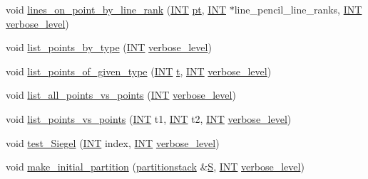 \begin{DoxyCompactItemize}
\item 
void \mbox{\hyperlink{classorthogonal_adc21874b6da3cd3585c704994fb538aa}{lines\+\_\+on\+\_\+point\+\_\+by\+\_\+line\+\_\+rank}} (\mbox{\hyperlink{galois_8h_a09fddde158a3a20bd2dcadb609de11dc}{I\+NT}} \mbox{\hyperlink{clique__finder_8_c_aec1f1a2b30fdca8844c2932384483145}{pt}}, \mbox{\hyperlink{galois_8h_a09fddde158a3a20bd2dcadb609de11dc}{I\+NT}} $\ast$line\+\_\+pencil\+\_\+line\+\_\+ranks, \mbox{\hyperlink{galois_8h_a09fddde158a3a20bd2dcadb609de11dc}{I\+NT}} \mbox{\hyperlink{simeon_8_c_a818073fbcc2f439e7c56952f67386122}{verbose\+\_\+level}})
\item 
void \mbox{\hyperlink{classorthogonal_a078981d509c626c1cdad322ab94c697c}{list\+\_\+points\+\_\+by\+\_\+type}} (\mbox{\hyperlink{galois_8h_a09fddde158a3a20bd2dcadb609de11dc}{I\+NT}} \mbox{\hyperlink{simeon_8_c_a818073fbcc2f439e7c56952f67386122}{verbose\+\_\+level}})
\item 
void \mbox{\hyperlink{classorthogonal_a80ded28f55a2191d5a5ec5fe9ee1a4c7}{list\+\_\+points\+\_\+of\+\_\+given\+\_\+type}} (\mbox{\hyperlink{galois_8h_a09fddde158a3a20bd2dcadb609de11dc}{I\+NT}} \mbox{\hyperlink{alphabet2_8_c_ac310d9181e916ba43604099aee272c71}{t}}, \mbox{\hyperlink{galois_8h_a09fddde158a3a20bd2dcadb609de11dc}{I\+NT}} \mbox{\hyperlink{simeon_8_c_a818073fbcc2f439e7c56952f67386122}{verbose\+\_\+level}})
\item 
void \mbox{\hyperlink{classorthogonal_aa896de1a55608e15b02df00777ac7ccb}{list\+\_\+all\+\_\+points\+\_\+vs\+\_\+points}} (\mbox{\hyperlink{galois_8h_a09fddde158a3a20bd2dcadb609de11dc}{I\+NT}} \mbox{\hyperlink{simeon_8_c_a818073fbcc2f439e7c56952f67386122}{verbose\+\_\+level}})
\item 
void \mbox{\hyperlink{classorthogonal_a80258158dfa1470b42e9036b07c7dfbb}{list\+\_\+points\+\_\+vs\+\_\+points}} (\mbox{\hyperlink{galois_8h_a09fddde158a3a20bd2dcadb609de11dc}{I\+NT}} t1, \mbox{\hyperlink{galois_8h_a09fddde158a3a20bd2dcadb609de11dc}{I\+NT}} t2, \mbox{\hyperlink{galois_8h_a09fddde158a3a20bd2dcadb609de11dc}{I\+NT}} \mbox{\hyperlink{simeon_8_c_a818073fbcc2f439e7c56952f67386122}{verbose\+\_\+level}})
\item 
void \mbox{\hyperlink{classorthogonal_ad6d248c572d92abe41416065addd4a69}{test\+\_\+\+Siegel}} (\mbox{\hyperlink{galois_8h_a09fddde158a3a20bd2dcadb609de11dc}{I\+NT}} index, \mbox{\hyperlink{galois_8h_a09fddde158a3a20bd2dcadb609de11dc}{I\+NT}} \mbox{\hyperlink{simeon_8_c_a818073fbcc2f439e7c56952f67386122}{verbose\+\_\+level}})
\item 
void \mbox{\hyperlink{classorthogonal_aea1837aaf362511a7a9c61b931374f58}{make\+\_\+initial\+\_\+partition}} (\mbox{\hyperlink{classpartitionstack}{partitionstack}} \&\mbox{\hyperlink{simeon_8_c_adab47f8243f1b5a2c31df2535d6b37d0}{S}}, \mbox{\hyperlink{galois_8h_a09fddde158a3a20bd2dcadb609de11dc}{I\+NT}} \mbox{\hyperlink{simeon_8_c_a818073fbcc2f439e7c56952f67386122}{verbose\+\_\+level}})

\end{DoxyCompactItemize}
